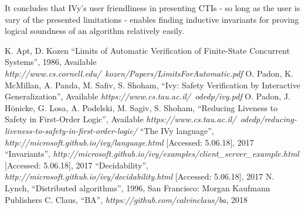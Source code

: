 \documentclass[fleqn]{article}
\begin{document}
It concludes that IVy's user friendliness in presenting CTIs - so long as the user is vary of the presented limitations - enables
finding inductive invariants for proving logical soundness of an algorithm relatively easily.



\begin{thebibliography}{99}
     K. Apt, D. Kozen ``Limits of Automatic Verification of Finite-State Concurrent Systems'', 1986, Available \textit{http://www.cs.cornell.edu/~kozen/Papers/LimitsForAutomatic.pdf}
     O. Padon, K. McMillan, A. Panda, M. Safiv, S. Shoham, ``Ivy: Safety Verification by Interactive Generalization'', Available \textit{https://www.cs.tau.ac.il/~odedp/ivy.pdf}
     O. Padon, J. Hönicke, G. Losa, A. Podelski, M. Sagiv, S. Shoham, ``Reducing Liveness to Safety in First-Order Logic'', Available \textit{https://www.cs.tau.ac.il/~odedp/reducing-liveness-to-safety-in-first-order-logic/}
     ``The IVy language'',  \textit{http://microsoft.github.io/ivy/language.html} [Accessed: 5.06.18], 2017
     ``Invariants'',  \textit{http://microsoft.github.io/ivy/examples/client\_server\_example.html} [Accessed: 5.06.18], 2017
     ``Decidability'',  \textit{http://microsoft.github.io/ivy/decidability.html} [Accessed: 5.06.18], 2017
     N. Lynch, ``Distributed algorithms'', 1996, San Francisco: Morgan Kaufmann Publishers
     C. Claus, ``BA'', \textit{https://github.com/calvinclaus/ba}, 2018

\end{thebibliography}

\end{document}
